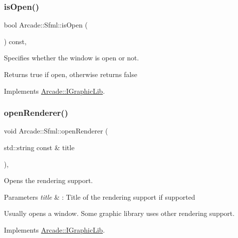 \subsubsection{\texorpdfstring{is\+Open()}{isOpen()}}
{\footnotesize\ttfamily bool Arcade\+::\+Sfml\+::is\+Open (\begin{DoxyParamCaption}{ }\end{DoxyParamCaption}) const\hspace{0.3cm}{\ttfamily [final]}, {\ttfamily [virtual]}}



Specifies whether the window is open or not. 

\begin{DoxyReturn}{Returns}
true if open, otherwise returns false 
\end{DoxyReturn}


Implements \hyperlink{class_arcade_1_1_i_graphic_lib_adf9e107fbcfbd91e5a3daa9a2db76b4b}{Arcade\+::\+I\+Graphic\+Lib}.

\mbox{\label{class_arcade_1_1_sfml_a9a868d1964ac2f24327329af971fdb57}} 
\subsubsection{\texorpdfstring{open\+Renderer()}{openRenderer()}}
{\footnotesize\ttfamily void Arcade\+::\+Sfml\+::open\+Renderer (\begin{DoxyParamCaption}\item[{std\+::string const \&}]{title }\end{DoxyParamCaption})\hspace{0.3cm}{\ttfamily [final]}, {\ttfamily [virtual]}}



Opens the rendering support. 


\begin{DoxyParams}{Parameters}
{\em title} & \+: Title of the rendering support if supported\\
\hline
\end{DoxyParams}
Usually opens a window. Some graphic library uses other rendering support. 

Implements \hyperlink{class_arcade_1_1_i_graphic_lib_a71f7f51bdd61b02377c4a9ec330eabb1}{Arcade\+::\+I\+Graphic\+Lib}.

